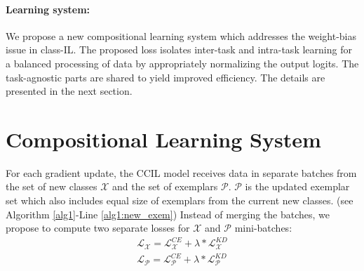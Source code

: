 \documentclass[final]{cvpr}
\newcommand{\ilkd}{CCIL }
\begin{document}
\paragraph{Learning system:}
We propose a new compositional learning system which addresses the weight-bias issue in class-IL. The proposed loss isolates inter-task and intra-task learning for a balanced processing of data by appropriately normalizing the output logits. The task-agnostic parts are shared to yield improved efficiency. The details are presented in the next section.

















 

\section{Compositional Learning System} \label{sec:compo_loss}



For each gradient update, the \ilkd model receives data in separate batches from the set of new classes $\mathcal{X}$ and the set of exemplars $\mathcal{P}$. $\mathcal{P}$ is the updated exemplar set which also includes equal size of exemplars from the current new classes. (see Algorithm \ref{alg1}-Line \ref{alg1:new_exem})
Instead of merging the batches, we propose to compute two separate losses for $\mathcal{X}$ and $\mathcal{P}$ mini-batches: \begin{align}
    \mathcal{L}_{\mathcal{X}} = \mathcal{L}^{CE}_{\mathcal{X}} +  \lambda*\mathcal{L}^{KD}_{\mathcal{X}}\\    
    \mathcal{L}_{\mathcal{P}} = \mathcal{L}^{CE}_{\mathcal{P}} +  \lambda*\mathcal{L}^{KD}_{\mathcal{P}}
\end{align}
\end{document}
